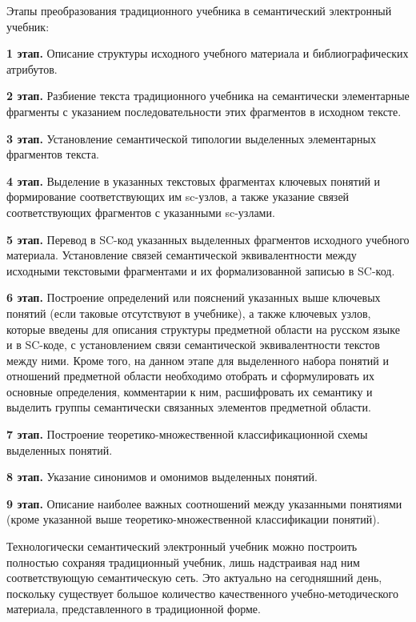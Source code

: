 Этапы преобразования традиционного учебника в семантический электронный учебник:

\textbf{1 этап.} Описание структуры исходного учебного материала и библиографических атрибутов.

\textbf{2 этап.} Разбиение текста традиционного учебника на семантически элементарные фрагменты с указанием последовательности этих фрагментов в исходном тексте.

\textbf{3 этап.} Установление семантической типологии выделенных элементарных фрагментов текста.

\textbf{4 этап.} Выделение в указанных текстовых фрагментах ключевых понятий и формирование соответствующих им sc-узлов, а также указание связей соответствующих фрагментов с указанными sc-узлами.

\textbf{5 этап.} Перевод в SC-код указанных выделенных фрагментов исходного учебного материала. Установление связей семантической эквивалентности между исходными текстовыми фрагментами и их формализованной записью в SC-код.

\textbf{6 этап.} Построение определений или пояснений указанных выше ключевых понятий (если таковые отсутствуют в учебнике), а также ключевых узлов, которые введены для описания структуры предметной области на русском языке и в SC-коде, с установлением связи семантической эквивалентности текстов между ними. Кроме того, на данном этапе для выделенного набора понятий и отношений предметной области необходимо отобрать и сформулировать их основные определения, комментарии к ним, расшифровать их семантику и выделить группы семантически связанных элементов предметной области.

\textbf{7 этап.} Построение теоретико-множественной классификационной схемы выделенных понятий.

\textbf{8 этап.} Указание синонимов и омонимов выделенных понятий.

\textbf{9 этап.} Описание наиболее важных соотношений между указанными понятиями (кроме указанной выше теоретико-множественной классификации понятий).

Технологически семантический электронный учебник можно построить полностью сохраняя традиционный учебник, лишь надстраивая над ним соответствующую семантическую сеть. Это актуально на сегодняшний день, поскольку существует большое количество качественного учебно-методического материала, представленного в традиционной форме.

\begin{SCn}
	\begin{scnsdclass}
	\end{scnsdclass}
\end{SCn}

